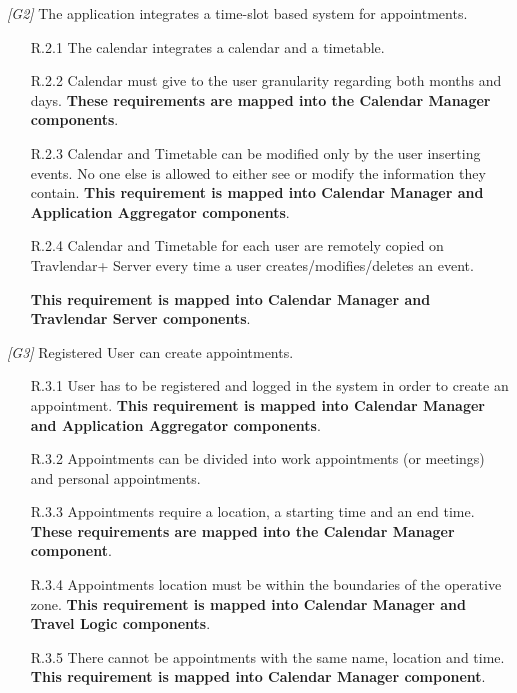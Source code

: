 \begin{description}
	\vskip0.75cm
	\item \textit{[G2]} The application integrates a time-slot based system for appointments.
		\begin{itemize}
			\item [R.2.1] The calendar integrates a calendar and a timetable.
			
			\item [R.2.2] Calendar must give to the user granularity regarding both months and days.
			\textbf{These requirements are mapped into the Calendar Manager components}.

			\item [R.2.3] Calendar and Timetable can be modified only by the user inserting events. No one else is allowed to either see or modify the information they contain.			
			\textbf{This requirement is mapped into Calendar Manager and Application Aggregator components}.
			
			\item [R.2.4] Calendar and Timetable for each user are remotely copied on Travlendar+ Server every time a user creates/modifies/deletes an event.
			
			\textbf{This requirement is mapped into Calendar Manager and Travlendar Server components}.
		\end{itemize}

	\vskip0.75cm
	\item \textit{[G3]} Registered User can create appointments.
		\begin{itemize}
			\item [R.3.1] User has to be registered and logged in the system in order to create an appointment.
			\textbf{This requirement is mapped into Calendar Manager and Application Aggregator components}.

			\item [R.3.2] Appointments can be divided into work appointments (or meetings) and personal appointments.

			\item [R.3.3] Appointments require a location, a starting time and an end time.
			\textbf{These requirements are mapped into the Calendar Manager component}.

			\item [R.3.4] Appointments location must be within the boundaries of the operative zone.
			\textbf{This requirement is mapped into Calendar Manager and Travel Logic components}.

			\item [R.3.5] There cannot be appointments with the same name, location and time.
			\textbf{This requirement is mapped into Calendar Manager component}.


\end{itemize}
\end{description}
